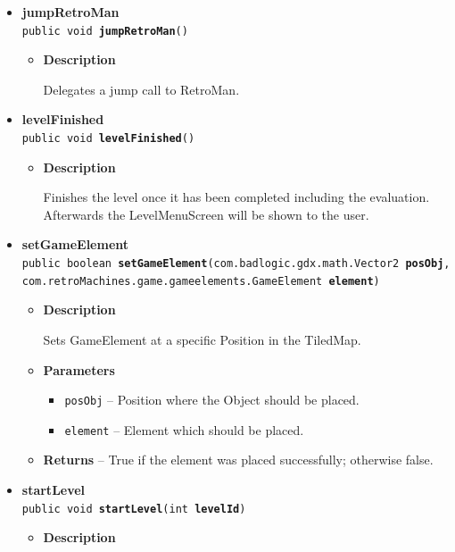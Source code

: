 \documentclass[11pt,a4paper]{report}
\begin{document}
{{{{{{{{\begin{itemize}
{\begin{itemize}
{Delegates an interact call to RetroMan.
}
\end{itemize}
}%
\item{ 
{\bf  jumpRetroMan}\\
\texttt{public void\ {\bf  jumpRetroMan}()
\label{com.retroMachines.game.controllers.GameController.jumpRetroMan()}}%
\begin{itemize}
\item{
{\bf  Description}

Delegates a jump call to RetroMan.
}
\end{itemize}
}%
\item{ 
{\bf  levelFinished}\\
\texttt{public void\ {\bf  levelFinished}()
\label{com.retroMachines.game.controllers.GameController.levelFinished()}}%
\begin{itemize}
\item{
{\bf  Description}

Finishes the level once it has been completed including the evaluation. Afterwards the LevelMenuScreen will be shown to the user.
}
\end{itemize}
}%
\item{ 
{\bf  setGameElement}\\
\texttt{public boolean\ {\bf  setGameElement}(\texttt{com.badlogic.gdx.math.Vector2} {\bf  posObj},
\texttt{com.retroMachines.game.gameelements.GameElement} {\bf  element})
\label{com.retroMachines.game.controllers.GameController.setGameElement(com.badlogic.gdx.math.Vector2, com.retroMachines.game.gameelements.GameElement)}}%
\begin{itemize}
\item{
{\bf  Description}

Sets GameElement at a specific Position in the TiledMap.
}
\item{
{\bf  Parameters}
  \begin{itemize}
   \item{
\texttt{posObj} -- Position where the Object should be placed.}
   \item{
\texttt{element} -- Element which should be placed.}
  \end{itemize}
}%
\item{{\bf  Returns} -- 
True if the element was placed successfully; otherwise false. 
}%
\end{itemize}
}%
\item{ 
{\bf  startLevel}\\
\texttt{public void\ {\bf  startLevel}(\texttt{int} {\bf  levelId})
\label{com.retroMachines.game.controllers.GameController.startLevel(int)}}%
\begin{itemize}
\item{
{\bf  Description}

}
\end{itemize}}
\end{itemize}}}}}}}}}
\end{document}
